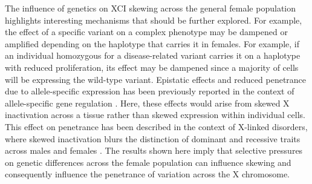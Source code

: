 The influence of genetics on XCI skewing across the general female population highlights interesting mechanisms that should be further explored. For example, the effect of a specific variant on a complex phenotype may be dampened or amplified depending on the haplotype that carries it in females. For example, if an individual homozygous for a disease-related variant carries it on a haplotype with reduced proliferation, its effect may be dampened since a majority of cells will be expressing the wild-type variant. Epistatic effects and reduced penetrance due to allele-specific expression has been previously reported in the context of allele-specific gene regulation \cite{Castel2018-wo,Lappalainen2011-mu}. Here, these effects would arise from skewed X inactivation across a tissue rather than skewed expression within individual cells. This effect on penetrance has been described in the context of X-linked disorders, where skewed inactivation blurs the distinction of dominant and recessive traits across males and females \cite{Dobyns2004-ac}. The results shown here imply that selective pressures on genetic differences across the female population can influence skewing and consequently influence the penetrance of variation across the X chromosome.
